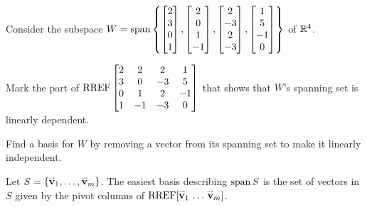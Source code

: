 \begin{applicationActivities}
\begin{activity}{10}
  Consider the subspace \(W=\operatorname{span}\left\{
  \begin{bmatrix}2\\3\\0\\1\end{bmatrix},
  \begin{bmatrix}2\\0\\1\\-1\end{bmatrix},
  \begin{bmatrix}2\\-3\\2\\-3\end{bmatrix},
  \begin{bmatrix}1\\5\\-1\\0\end{bmatrix}
  \right\}
  \) of \(\mathbb{R}^4\).

  \begin{subactivity}
    Mark the part of \(\operatorname{RREF}\begin{bmatrix}
    2&2&2&1\\
    3&0&-3&5\\
    0&1&2&-1\\
    1&-1&-3&0
    \end{bmatrix}\) that shows that \(W\)'s spanning set
    is linearly dependent.
  \end{subactivity}

  \begin{subactivity}
    Find a basis for \(W\) by removing a vector from its spanning set
    to make it linearly independent.
  \end{subactivity}
\end{activity}

\begin{fact}
  Let \(S=\{\mathbf{\accentset{\rightharpoonup}{v}}_1,\dots,\mathbf{\accentset{\rightharpoonup}{v}}_m\}\). The easiest basis describing
  \(\operatorname{span} S\) is the set of vectors in \(S\) given by the pivot columns
  of \(\operatorname{RREF}[\mathbf{\accentset{\rightharpoonup}{v}}_1\,\dots\,\mathbf{\accentset{\rightharpoonup}{v}}_m]\).

  \vspace{1em}


\end{fact}
\end{applicationActivities}
